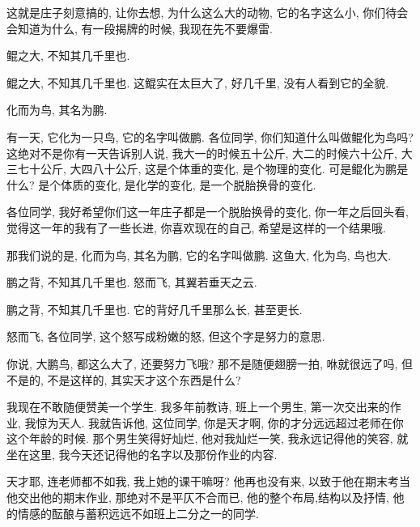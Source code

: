 \documentclass[11pt]{article}
\begin{document}
这就是庄子刻意搞的, 让你去想, 为什么这么大的动物, 它的名字这么小, 你们待会会知道为什么, 有一段揭牌的时候, 我现在先不要爆雷.

\begin{center}
	{\color{magenta} 鲲之大, 不知其几千里也.}
\end{center}

\vspace{-0.5cm}

{\color{blue} 鲲之大, 不知其几千里也.} 这鲲实在太巨大了, 好几千里, 没有人看到它的全貌. 

\begin{center}
	{\color{magenta} 化而为鸟, 其名为鹏.}
\end{center}

\vspace{-0.5cm}

有一天, 它化为一只鸟, 它的名字叫做鹏. 各位同学, 你们知道什么叫做鲲化为鸟吗? 这绝对不是你有一天告诉别人说, 我大一的时候五十公斤, 大二的时候六十公斤, 大三七十公斤, 大四八十公斤, 这是个体重的变化, 是个物理的变化. 可是鲲化为鹏是什么? 是个体质的变化, 是化学的变化, 是一个脱胎换骨的变化. 

各位同学, 我好希望你们这一年庄子都是一个脱胎换骨的变化, 你一年之后回头看, 觉得这一年的我有了一些长进, 你喜欢现在的自己, 希望是这样的一个结果哦. 

那我们说的是, {\color{blue} 化而为鸟, 其名为鹏}, 它的名字叫做鹏. 这鱼大, 化为鸟, 鸟也大.

\begin{center}
	{\color{magenta} 鹏之背, 不知其几千里也. 怒而飞, 其翼若垂天之云.}
\end{center}

\vspace{-0.5cm}

{\color{blue} 鹏之背, 不知其几千里也.} 它的背好几千里那么长, 甚至更长.

{\color{blue} 怒而飞}, 各位同学, 这个怒写成粉嫩的怒, 但这个字是努力的意思. 

你说, 大鹏鸟, 都这么大了, 还要努力飞哦? 那不是随便翅膀一拍, 咻就很远了吗, 但不是的, 不是这样的, 其实天才这个东西是什么? 

我现在不敢随便赞美一个学生. 我多年前教诗, 班上一个男生, 第一次交出来的作业, 我惊为天人. 我就告诉他, 这位同学, 你是天才啊, 你的才分远远超过老师在你这个年龄的时候. 那个男生笑得好灿烂, 他对我灿烂一笑, 我永远记得他的笑容, 就坐在这里, 我今天还记得他的名字以及那份作业的内容. 

天才耶, 连老师都不如我, 我上她的课干嘛呀? 他再也没有来, 以致于他在期末考当他交出他的期末作业, 那绝对不是平仄不合而已, 他的整个布局,结构以及抒情, 他的情感的酝酿与蓄积远远不如班上二分之一的同学.
\end{document}
